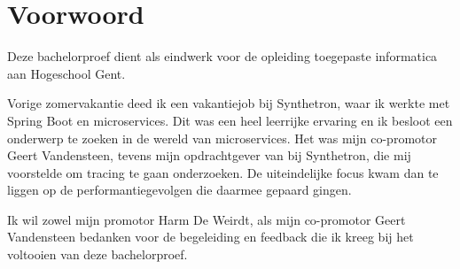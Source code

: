 
\chapter*{Voorwoord}
\label{ch:voorwoord}


Deze bachelorproef dient als eindwerk voor de opleiding toegepaste informatica aan Hogeschool Gent.

Vorige zomervakantie deed ik een vakantiejob bij Synthetron, waar ik werkte met Spring Boot en microservices. Dit was een heel leerrijke ervaring en ik besloot een onderwerp te zoeken in de wereld van microservices. Het was mijn co-promotor Geert Vandensteen, tevens mijn opdrachtgever van bij Synthetron, die mij voorstelde om tracing te gaan onderzoeken. De uiteindelijke focus kwam dan te liggen op de performantiegevolgen die daarmee gepaard gingen.

Ik wil zowel mijn promotor Harm De Weirdt, als mijn co-promotor Geert Vandensteen bedanken voor de begeleiding en feedback die ik kreeg bij het voltooien van deze bachelorproef.


